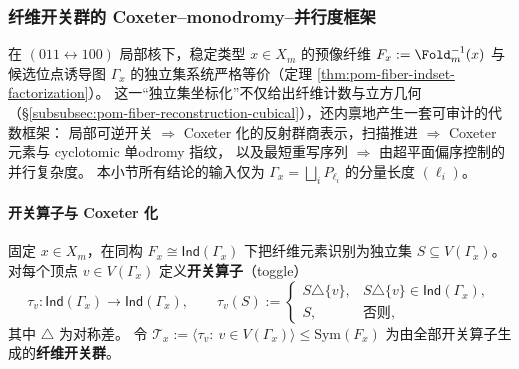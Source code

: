 \subsubsection{纤维开关群的 Coxeter--monodromy--并行度框架}\label{subsubsec:pom-fiber-toggle-coxeter-monodromy-parallelism}
在 \((011\leftrightarrow 100)\) 局部核下，稳定类型 \(x\in X_m\) 的预像纤维
\(
F_x:=\Fold_m^{-1}(x)
\)
与候选位点诱导图 \(\Gamma_x\) 的独立集系统严格等价（定理 \ref{thm:pom-fiber-indset-factorization}）。
这一“独立集坐标化”不仅给出纤维计数与立方几何（\S\ref{subsubsec:pom-fiber-reconstruction-cubical}），还内禀地产生一套可审计的代数框架：
局部可逆开关 \(\Rightarrow\) Coxeter 化的反射群商表示，扫描推进 \(\Rightarrow\) Coxeter 元素与 cyclotomic 单odromy 指纹，
以及最短重写序列 \(\Rightarrow\) 由超平面偏序控制的并行复杂度。
本小节所有结论的输入仅为 \(\Gamma_x=\bigsqcup_i P_{\ell_i}\) 的分量长度 \((\ell_i)\)。

\paragraph{开关算子与 Coxeter 化}

\begin{definition}[纤维开关算子与开关群]\label{def:pom-fiber-toggle-group}
固定 \(x\in X_m\)，在同构 \(F_x\cong \mathsf{Ind}(\Gamma_x)\) 下把纤维元素识别为独立集 \(S\subseteq V(\Gamma_x)\)。
对每个顶点 \(v\in V(\Gamma_x)\) 定义\textbf{开关算子}（toggle）
\[
\tau_v:\mathsf{Ind}(\Gamma_x)\to \mathsf{Ind}(\Gamma_x),
\qquad
\tau_v(S):=
\begin{cases}
S\triangle\{v\},& S\triangle\{v\}\in \mathsf{Ind}(\Gamma_x),\\
S,& \text{否则},
\end{cases}
\]
其中 \(\triangle\) 为对称差。
令 \(\mathcal T_x:=\langle \tau_v:\ v\in V(\Gamma_x)\rangle\le \mathrm{Sym}(F_x)\) 为由全部开关算子生成的\textbf{纤维开关群}。
\end{definition}


